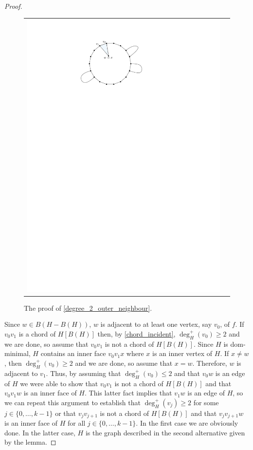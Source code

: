 \documentclass[12pt]{article}
\theoremstyle{definition}
\begin{document}
\begin{proof}
\begin{figure}[htbp]
\begin{center}
\begin{tabular}{cc}
         \includegraphics[page=2]{figs/degree_2_outer_neighbour}
       \end{tabular}
     \end{center}
     \caption{The proof of \cref{degree_2_outer_neighbour}.}
     \label{degree_2_outer_neighbour_fig}
   \end{figure}

   Since $w\in B(H-B(H))$, $w$ is adjacent to at least one vertex, say $v_0$, of $f$.  If $v_0v_{1}$ is a chord of $H[B(H)]$ then, by \cref{chord_incident}, $\deg^+_H(v_0)\ge 2$ and we are done, so assume that $v_0v_{1}$ is not a chord of $H[B(H)]$.  Since $H$ is dom-minimal, $H$ contains an inner face $v_0v_{1}x$ where $x$ is an inner vertex of $H$.  If $x\neq w$, then $\deg_H^+(v_0)\ge 2$ and we are done, so assume that $x=w$.  Therefore, $w$ is adjacent to $v_1$.  Thus, by assuming that $\deg^+_H(v_0)\le 2$ and that $v_0w$ is an edge of $H$ we were able to show that $v_0v_1$ is not a chord of $H[B(H)]$ and that $v_0v_1w$ is an inner face of $H$. This latter fact implies that $v_1w$ is an edge of $H$, so we can repeat this argument to establish that $\deg^+_H(v_j)\ge 2$ for some $j\in\{0,\ldots,k-1\}$ or that $v_{j}v_{j+1}$ is not a chord of $H[B(H)]$ and that $v_{j}v_{j+1}w$ is an inner face of $H$ for all $j\in\{0,\ldots,k-1\}$.  In the first case we are obviously done. In the latter case, $H$ is the graph described in the second alternative given by the lemma.
\end{proof}
\end{document}
